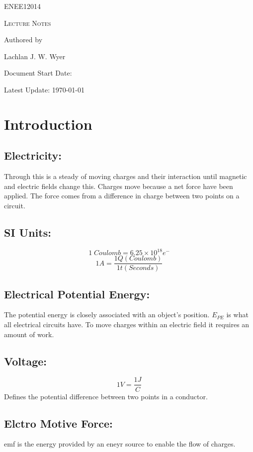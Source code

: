 \documentclass[a5paper]{article}
\date{19\textsuperscript{th} of June 2026}
\begin{document}
	\begin{titlepage}
		\centering
		{\Huge \textsc{ENEE12014}\par}
		\vspace{1cm}
		{\Large \textsc{Lecture Notes}\par}
		\vspace{2.5cm}
		\vfill
		Authored by\par
		Lachlan J. W. Wyer
		\vfill
		\makeatletter
		{\large Document Start Date: \@date \par}
		\makeatother
		{\large Latest Update: \today\par}
	\end{titlepage}
	\tableofcontents
	\pagebreak

	\section{Introduction}
	\subsection{Electricity:}
	Through this is a steady of moving charges and their interaction until magnetic and electric fields change this. Charges move because a net force have been applied. The force comes from a difference in charge between two points on a circuit.
	\subsection{SI Units:}
	$$1\;Coulomb=6.25\times10^{18}e^{-}$$
	$$1A=\frac{1Q(Coulomb)}{1t(Seconds)}$$
	\subsection{Electrical Potential Energy:}
	The potential energy is closely associated with an object's position. $E_{PE}$ is what all electrical circuits have. To move charges within an electric field it requires an amount of work.
	\subsection{Voltage:}
	$$1V=\frac{1J}{C}$$
	Defines the potential difference between two points in a conductor.
	\subsection{Elctro Motive Force:}
	emf is the energy provided by an eneyr source to enable the flow of charges.
\end{document}
